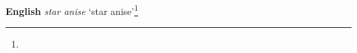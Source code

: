 \begin{etymology}\label{ety:star anise}
\textbf{English} \textit{star anise} `star anise'\footnote{}
\end{etymology}